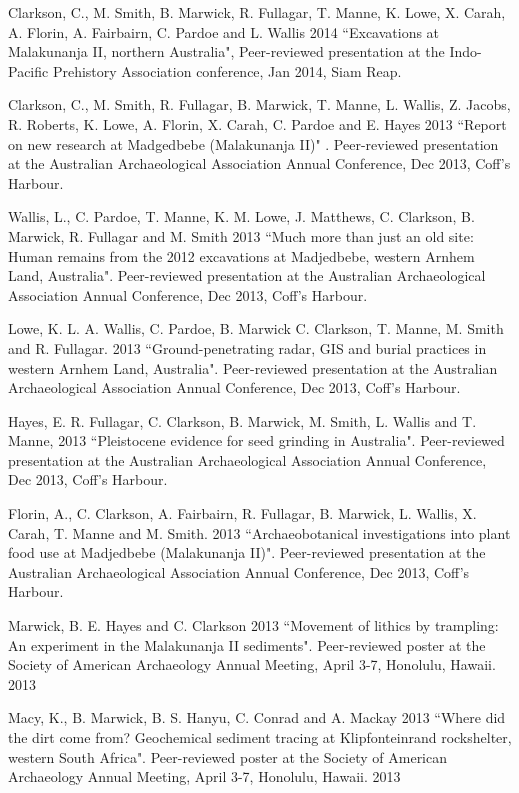 {{\ind Clarkson, C., M. Smith, B. Marwick, R. Fullagar, T. Manne, K. Lowe, X. Carah,  A. Florin, A.  Fairbairn, C. Pardoe and L. Wallis 2014 ``Excavations at Malakunanja II, northern Australia",  Peer-reviewed presentation at the Indo-Pacific Prehistory Association conference, Jan 2014, Siam Reap.

\ind Clarkson, C., M. Smith, R. Fullagar, B. Marwick, T. Manne, L. Wallis, Z. Jacobs, R. Roberts, K. Lowe, A. Florin, X. Carah, C. Pardoe and E. Hayes 2013 ``Report on new research at Madgedbebe (Malakunanja II)" . Peer-reviewed presentation at the Australian Archaeological Association Annual Conference, Dec 2013, Coff’s Harbour.

\ind Wallis, L., C. Pardoe, T. Manne, K. M. Lowe, J. Matthews, C.   Clarkson, B. Marwick, R. Fullagar and M. Smith 2013 ``Much more than just an old site: Human remains from the 2012 excavations at Madjedbebe, western Arnhem Land, Australia". Peer-reviewed presentation at the Australian Archaeological Association Annual Conference, Dec 2013, Coff’s Harbour.

\ind Lowe, K. L. A. Wallis, C. Pardoe, B. Marwick C. Clarkson, T. Manne, M. Smith and R. Fullagar. 2013 ``Ground-penetrating radar, GIS and burial practices in western Arnhem Land, Australia". Peer-reviewed presentation at the Australian Archaeological Association Annual Conference, Dec 2013, Coff’s Harbour.

\ind Hayes, E.  R. Fullagar, C. Clarkson, B. Marwick, M. Smith, L. Wallis and T. Manne, 2013 ``Pleistocene evidence for seed grinding in Australia". Peer-reviewed presentation at the Australian Archaeological Association Annual Conference, Dec 2013, Coff’s Harbour.

\ind Florin, A., C. Clarkson, A. Fairbairn, R. Fullagar, B. Marwick, L. Wallis, X. Carah, T. Manne and M. Smith. 2013 ``Archaeobotanical investigations into plant food use at Madjedbebe (Malakunanja II)". Peer-reviewed presentation at the Australian Archaeological Association Annual Conference, Dec 2013, Coff’s Harbour.

\ind Marwick, B. E. Hayes and C. Clarkson 2013 ``Movement of lithics by trampling: An experiment in the Malakunanja II sediments". Peer-reviewed poster at the Society of American Archaeology Annual Meeting, April 3-7, Honolulu, Hawaii. 2013

\ind Macy, K., B. Marwick, B. S. Hanyu, C. Conrad and A. Mackay 2013 ``Where did the dirt come from? Geochemical sediment tracing at Klipfonteinrand rockshelter, western South Africa". Peer-reviewed poster at the Society of American Archaeology Annual Meeting, April 3-7, Honolulu, Hawaii. 2013

}}
